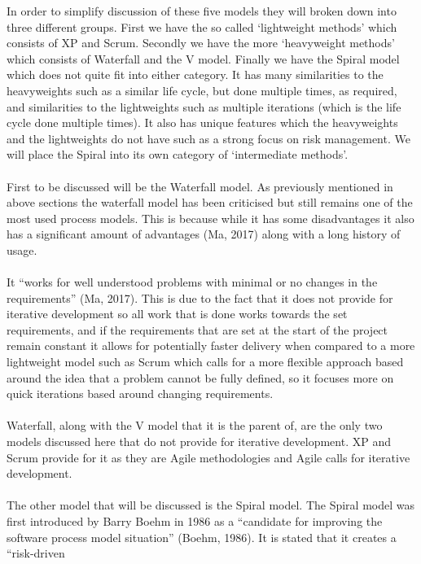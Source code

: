 \documentclass{CRPITStyle}
\begin{document}
		In order to simplify discussion of these five models they will broken down into three different groups. First we have the so called `lightweight
		methods' which consists of XP and Scrum. Secondly we have the more `heavyweight methods' which consists of Waterfall and the V model. Finally
		we have the Spiral model which does not quite fit into either category. It has many similarities to the heavyweights such as a similar life cycle, but
		done multiple times, as required, and similarities to the lightweights such as multiple iterations (which is the life cycle done multiple times). It also
		has unique features which the heavyweights and the lightweights do not have such as a strong focus on risk management. We will place the
		Spiral into its own category of `intermediate methods'.\\
		~\\
		First to be discussed will be the Waterfall model. As previously mentioned in above sections the waterfall model has been criticised
		but still remains one of the most used process models.
		This is because while it has some disadvantages it also has a significant amount of advantages (Ma, 2017) along with a long history of usage.\\
		~\\
		It ``works for well understood problems with minimal or no changes in the requirements'' (Ma, 2017). This is due to the fact that
		it does not provide for iterative development so all work that is done works towards the set requirements, and if the requirements
		that are set at the start of the project remain constant it allows for potentially faster delivery when compared to a more lightweight
		model such as Scrum which calls for a more flexible approach based around the idea that a problem cannot be fully defined, so it focuses
		more on quick iterations based around changing requirements.\\
		~\\
		Waterfall, along with the V model that it is the parent of, are the only two models discussed here that do not provide for iterative
		development. XP and Scrum provide for it as they are Agile methodologies and Agile calls for iterative development.\\
		~\\
		 The other model that will be discussed is the Spiral model. The Spiral model was first introduced by Barry Boehm in 
		 1986 as a ``candidate for improving the software process model situation'' (Boehm, 1986). It is stated that it creates a ``risk-driven
\end{document}
